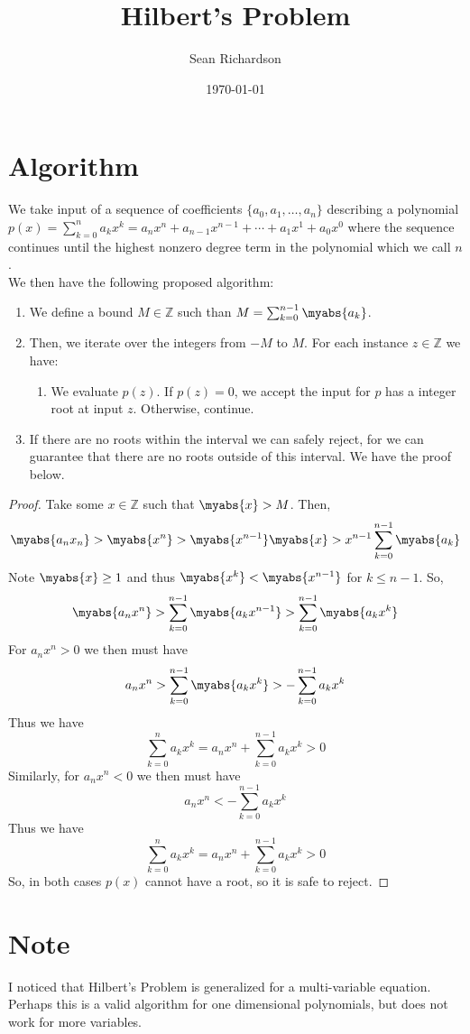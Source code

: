 \documentclass[12pt]{article}
\begin{document}
\title{\Huge{Hilbert's Problem}}
\author{\normalsize{Sean Richardson}}
\date{\normalsize{\today}}
\maketitle


\section{Algorithm}
We take input of a sequence of coefficients $\{a_0,a_1,\dots,a_n\}$
describing
a polynomial $p(x) = \sum_{k=0}^{n}a_k x^k = a_n x^n + a_{n-1}x^{n-1} + \cdots +
a_1 x^1 + a_0 x^0$ where the sequence continues until the highest nonzero
degree term in the polynomial which we call $n$.
\\We then have the following proposed algorithm:

\begin{enumerate}
    \item We define a bound $M \in \mathbb{Z}$ such than $M =
        \sum_{k=0}^{n-1}\myabs{a_k}$.
    \item Then, we iterate over the integers from $-M$ to $M$. For each
        instance $z \in \mathbb{Z}$ we have:
    \begin{enumerate}
        \item We evaluate $p(z)$. If $p(z) = 0$, we accept the input for
            $p$ has a integer root at input $z$.
            Otherwise, continue.
    \end{enumerate}
    \item If there are no roots within the interval we can safely reject,
        for we can guarantee that there are no roots outside of this
        interval. We have the proof below.
\end{enumerate}
\begin{proof}
    Take some $x \in \mathbb{Z}$ such that $\myabs{x} > M$. Then,
    $$ \myabs{a_n x_n} > \myabs{x^n} > \myabs{x^{n-1}}\myabs{x} >
    x^{n-1}\sum_{k=0}^{n-1}\myabs{a_k} $$
    Note $\myabs{x} \geq 1$ and thus $\myabs{x^k} < \myabs{x^{n-1}}$ for $k \leq n-1$.
    So, 
    $$\myabs{a_n x^n} > \sum_{k=0}^{n-1}\myabs{a_k x^{n-1}} >
    \sum_{k=0}^{n-1}\myabs{a_k x^k}$$
    For $a_n x^n > 0$ we then must have
    $$ a_n x^n > \sum_{k=0}^{n-1}\myabs{a_k x^k} > -\sum_{k=0}^{n-1}a_k x^k$$
    Thus we have 
    $$\sum_{k=0}^{n}a_k x^k = a_n x^n + \sum_{k=0}^{n-1} a_k x^k > 0$$
    Similarly, for $a_n x^n < 0$ we then must have
    $$ a_n x^n < -\sum_{k=0}^{n-1}a_k x^k$$
    Thus we have 
    $$\sum_{k=0}^{n}a_k x^k = a_n x^n + \sum_{k=0}^{n-1} a_k x^k > 0$$
    So, in both cases $p(x)$ cannot have a root, so it is safe to reject.
\end{proof}

\sectionfont{\fontsize{12}{15}\selectfont}
\section{Note}
I noticed that Hilbert's Problem is generalized for a multi-variable
equation. Perhaps this is a valid algorithm for one dimensional
polynomials, but does not work for more variables.
\end{document}
